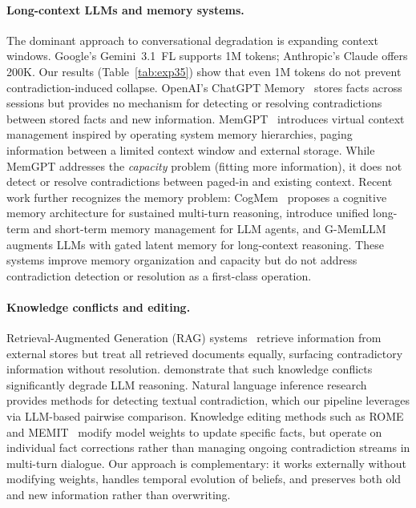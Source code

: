 \documentclass[11pt,a4paper]{article}
\begin{document}
\paragraph{Long-context LLMs and memory systems.}
The dominant approach to conversational degradation is expanding context windows.
Google's Gemini~3.1~FL supports 1M tokens; Anthropic's Claude offers 200K.
Our results (Table~\ref{tab:exp35}) show that even 1M tokens do not prevent contradiction-induced collapse.
OpenAI's ChatGPT Memory~\citep{openai2024memory} stores facts across sessions but provides no mechanism for detecting or resolving contradictions between stored facts and new information.
MemGPT~\citep{packer2023memgpt} introduces virtual context management inspired by operating system memory hierarchies, paging information between a limited context window and external storage.
While MemGPT addresses the \emph{capacity} problem (fitting more information), it does not detect or resolve contradictions between paged-in and existing context.
Recent work further recognizes the memory problem: CogMem~\citep{cogmem2025} proposes a cognitive memory architecture for sustained multi-turn reasoning, \citet{agenticmem2026} introduce unified long-term and short-term memory management for LLM agents, and G-MemLLM~\citep{gmemllm2026} augments LLMs with gated latent memory for long-context reasoning.
These systems improve memory organization and capacity but do not address contradiction detection or resolution as a first-class operation.

\paragraph{Knowledge conflicts and editing.}
Retrieval-Augmented Generation (RAG) systems~\citep{lewis2020rag} retrieve information from external stores but treat all retrieved documents equally, surfacing contradictory information without resolution.
\citet{xie2024knowledge} demonstrate that such knowledge conflicts significantly degrade LLM reasoning.
Natural language inference research~\citep{bowman2015snli,williams2018multinli} provides methods for detecting textual contradiction, which our pipeline leverages via LLM-based pairwise comparison.
Knowledge editing methods such as ROME~\citep{meng2022rome} and MEMIT~\citep{meng2023memit} modify model weights to update specific facts, but operate on individual fact corrections rather than managing ongoing contradiction streams in multi-turn dialogue.
Our approach is complementary: it works externally without modifying weights, handles temporal evolution of beliefs, and preserves both old and new information rather than overwriting.
\end{document}
